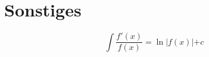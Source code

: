 \section{Sonstiges}

\begin{equation*}
    \int \frac{f'(x)}{f(x)} = \ln\lvert f(x)\lvert + c
\end{equation*}

